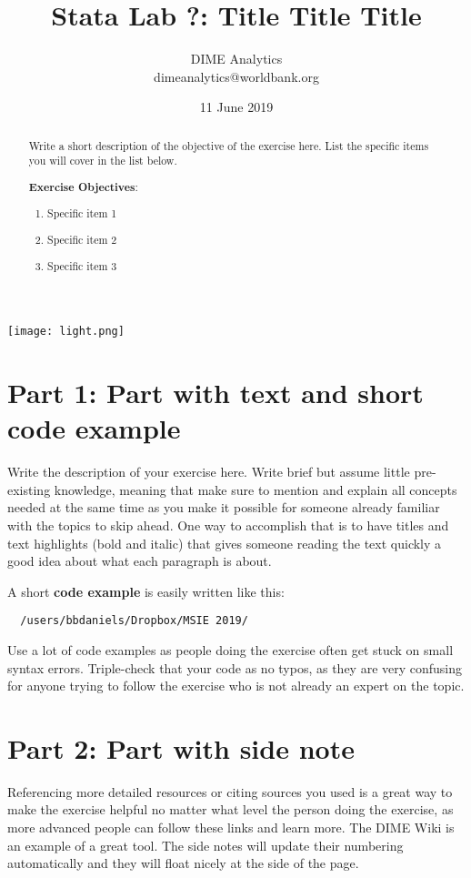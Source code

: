 \documentclass{tufte-handout}
\title{Stata Lab ?: Title Title Title}
\author{DIME Analytics \\ dimeanalytics@worldbank.org}
\date{11 June 2019}  %
\begin{document}
\maketitle%

\begin{marginfigure}%
  \texttt{[image: light.png]}
\end{marginfigure}

\begin{abstract}
Write a short description of the objective of the exercise here. List the specific items you will cover in the list below.

\bigskip\noindent \textbf{Exercise Objectives}:
\begin{enumerate}
  \item Specific item 1
  \item Specific item 2
  \item Specific item 3
\end{enumerate}
\end{abstract}

\section{Part 1: Part with text and short code example}

Write the description of your exercise here. Write brief but assume little pre-existing knowledge, meaning that make sure to mention and explain all concepts needed at the same time as you make it possible for someone already familiar with the topics to skip ahead. One way to accomplish that is to have titles and text highlights (bold and italic) that gives someone reading the text quickly a good idea about what each paragraph is about.

A short \textbf{code example} is easily written like this:

\begin{Verbatim}
  /users/bbdaniels/Dropbox/MSIE 2019/
\end{Verbatim}


Use a lot of code examples as people doing the exercise often get stuck on small syntax errors. Triple-check that your code as no typos, as they are very confusing for anyone trying to follow the exercise who is not already an expert on the topic.

\section{Part 2: Part with side note}
Referencing more detailed resources or citing sources you used is a great way to make the exercise helpful no matter what level the person doing the exercise, as more advanced people can follow these links and learn more. The DIME Wiki is an example of a great tool. The side notes will update their numbering automatically and they will float nicely at the side of the page.
\end{document}
